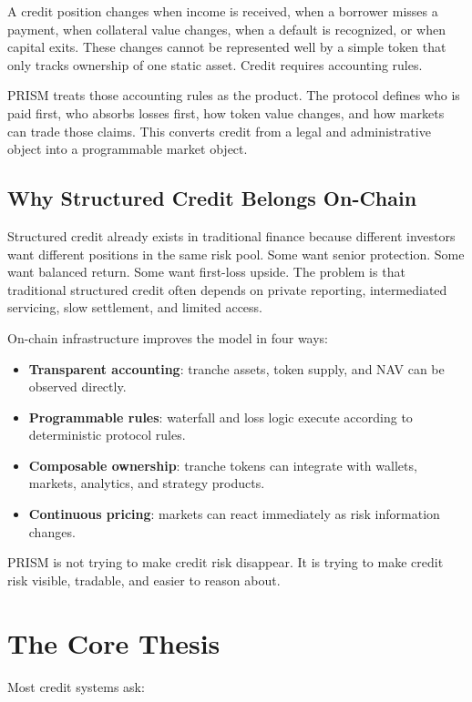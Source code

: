 \documentclass[11pt]{article}
\begin{document}
A credit position changes when income is received, when a borrower misses a
payment, when collateral value changes, when a default is recognized, or when
capital exits. These changes cannot be represented well by a simple token that
only tracks ownership of one static asset. Credit requires accounting rules.

PRISM treats those accounting rules as the product. The protocol defines who is
paid first, who absorbs losses first, how token value changes, and how markets
can trade those claims. This converts credit from a legal and administrative
object into a programmable market object.

\subsection{Why Structured Credit Belongs On-Chain}

Structured credit already exists in traditional finance because different
investors want different positions in the same risk pool. Some want senior
protection. Some want balanced return. Some want first-loss upside. The problem
is that traditional structured credit often depends on private reporting,
intermediated servicing, slow settlement, and limited access.

On-chain infrastructure improves the model in four ways:

\begin{itemize}
  \item \textbf{Transparent accounting}: tranche assets, token supply, and NAV
  can be observed directly.
  \item \textbf{Programmable rules}: waterfall and loss logic execute according
  to deterministic protocol rules.
  \item \textbf{Composable ownership}: tranche tokens can integrate with wallets,
  markets, analytics, and strategy products.
  \item \textbf{Continuous pricing}: markets can react immediately as risk
  information changes.
\end{itemize}

PRISM is not trying to make credit risk disappear. It is trying to make credit
risk visible, tradable, and easier to reason about.

\section{The Core Thesis}

Most credit systems ask:
\end{document}
